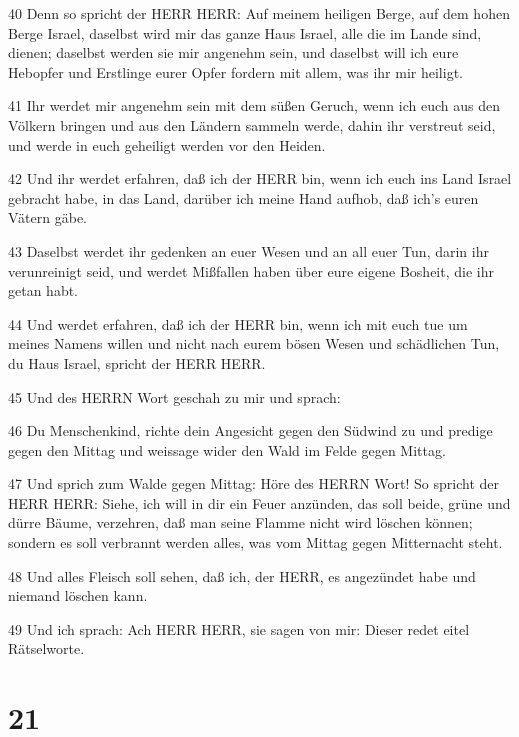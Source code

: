 \par 40 Denn so spricht der HERR HERR: Auf meinem heiligen Berge, auf dem hohen Berge Israel, daselbst wird mir das ganze Haus Israel, alle die im Lande sind, dienen; daselbst werden sie mir angenehm sein, und daselbst will ich eure Hebopfer und Erstlinge eurer Opfer fordern mit allem, was ihr mir heiligt.
\par 41 Ihr werdet mir angenehm sein mit dem süßen Geruch, wenn ich euch aus den Völkern bringen und aus den Ländern sammeln werde, dahin ihr verstreut seid, und werde in euch geheiligt werden vor den Heiden.
\par 42 Und ihr werdet erfahren, daß ich der HERR bin, wenn ich euch ins Land Israel gebracht habe, in das Land, darüber ich meine Hand aufhob, daß ich's euren Vätern gäbe.
\par 43 Daselbst werdet ihr gedenken an euer Wesen und an all euer Tun, darin ihr verunreinigt seid, und werdet Mißfallen haben über eure eigene Bosheit, die ihr getan habt.
\par 44 Und werdet erfahren, daß ich der HERR bin, wenn ich mit euch tue um meines Namens willen und nicht nach eurem bösen Wesen und schädlichen Tun, du Haus Israel, spricht der HERR HERR.
\par 45 Und des HERRN Wort geschah zu mir und sprach:
\par 46 Du Menschenkind, richte dein Angesicht gegen den Südwind zu und predige gegen den Mittag und weissage wider den Wald im Felde gegen Mittag.
\par 47 Und sprich zum Walde gegen Mittag: Höre des HERRN Wort! So spricht der HERR HERR: Siehe, ich will in dir ein Feuer anzünden, das soll beide, grüne und dürre Bäume, verzehren, daß man seine Flamme nicht wird löschen können; sondern es soll verbrannt werden alles, was vom Mittag gegen Mitternacht steht.
\par 48 Und alles Fleisch soll sehen, daß ich, der HERR, es angezündet habe und niemand löschen kann.
\par 49 Und ich sprach: Ach HERR HERR, sie sagen von mir: Dieser redet eitel Rätselworte.

\chapter{21}

